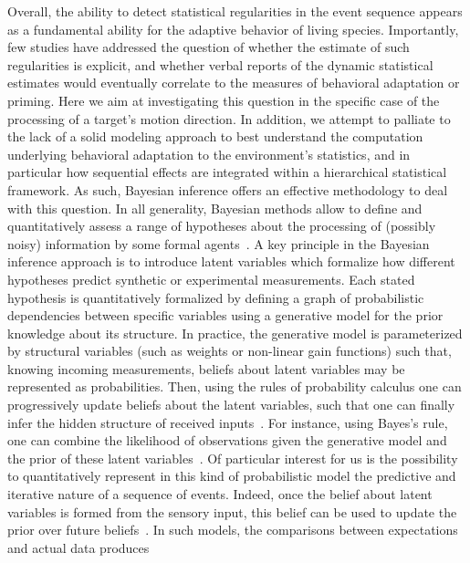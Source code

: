 \documentclass[12pt,english]{article}%
\newcommand{\citep}[1]{\parencite{#1}}
\begin{document}
Overall, the ability to detect
statistical regularities in the event sequence appears as a fundamental ability
for the adaptive behavior of living species.
Importantly, few studies have addressed the question of whether
the estimate of such regularities is explicit,
and whether verbal reports of the dynamic statistical
estimates would eventually correlate to the measures of behavioral adaptation or priming. 
Here we aim at investigating this question 
in the specific case of the  processing of a target's motion direction.
In addition, we attempt to palliate to the lack of a solid modeling approach 
to best understand the computation underlying behavioral adaptation to the environment's statistics,
and in particular how sequential effects are integrated
within a hierarchical statistical framework.
As such, Bayesian inference offers an effective methodology
to deal with this question.
In all generality, Bayesian methods allow to define and quantitatively assess
a range of hypotheses about the processing of (possibly noisy) information by some formal agents~\citep{Deneve1999, Diaconescu2014, Daunizeau10a}.
A key principle in the Bayesian inference approach is
to introduce latent variables which formalize how different hypotheses predict synthetic or experimental measurements.
Each stated hypothesis is quantitatively formalized
by defining a graph of probabilistic dependencies between specific variables
using a generative model for the prior knowledge about its structure.
In practice, the generative model is parameterized by structural variables
(such as weights or non-linear gain functions)
such that, knowing incoming measurements, beliefs about latent variables
may be represented as probabilities.
Then, using the rules of probability calculus
one can progressively update beliefs about the latent variables,
such that one can finally infer the hidden structure of received inputs~\citep{Hoyer2003, Ma2014}.
For instance, using Bayes's rule, one can combine
the likelihood of observations given the generative model and
the prior of these latent variables~\citep{Janes2014}.
Of particular interest for us is the possibility to
quantitatively represent in this kind of probabilistic model
the predictive and iterative nature of a sequence of events.
Indeed, once the belief about latent variables
is formed from the sensory input,
this belief can be used to update
the prior over future beliefs~\citep{Montagnini2007}.
In such models, the comparisons between expectations and actual data produces
\end{document}
